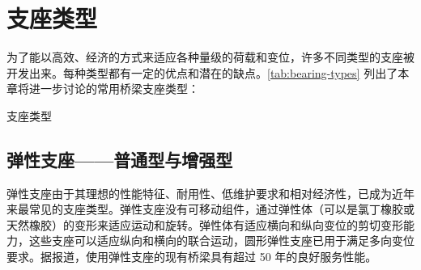 \section{支座类型}
\label{sec:bearing-types}
为了能以高效、经济的方式来适应各种量级的荷载和变位，许多不同类型的支座被开发出来。每种类型都有一定的优点和潜在的缺点。\cref{tab:bearing-types} 列出了本章将进一步讨论的常用桥梁支座类型：

\begin{table}
  \caption{支座类型}\label{tab:bearing-types}
  
\end{table}


\subsection{弹性支座——普通型与增强型}
弹性支座由于其理想的性能特征、耐用性、低维护要求和相对经济性，已成为近年来最常见的支座类型。弹性支座没有可移动组件，通过弹性体（可以是氯丁橡胶或天然橡胶）的变形来适应运动和旋转。弹性体有适应横向和纵向变位的剪切变形能力，这些支座可以适应纵向和横向的联合运动，圆形弹性支座已用于满足多向变位要求。据报道，使用弹性支座的现有桥梁具有超过 50 年的良好服务性能。

